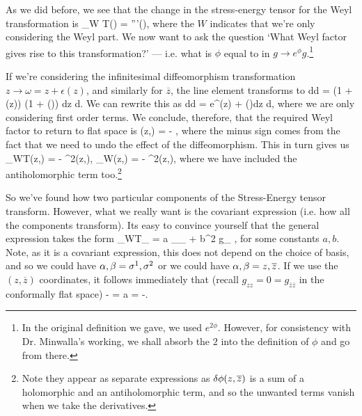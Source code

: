 As we did before, we see that the change in the stress-energy tensor for the Weyl transformation is
\bse 
    \del_W T(\omega) = \epsilon'''(\omega),
\ese
where the $W$ indicates that we're only considering the Weyl part. We now want to ask the question `What Weyl factor gives rise to this transformation?' --- i.e. what is $\phi$ equal to in $g \to e^{\phi}g$.\footnote{In the original definition we gave, we used $e^{2\phi}$. However, for consistency with Dr. Minwalla's working, we shall absorb the $2$ into the definition of $\phi$ and go from there.} 

If we're considering the infinitesimal diffeomorphism transformation $z \to \omega = z +\epsilon(z)$, and similarly for $\overline{z}$, the line element transforms to
\bse 
    d\omega d\overline{\omega} = \big(1 + \p\epsilon(z)\big) \big(1 + \overline{\p}\overline{\epsilon}()\big) dz d.
\ese 
We can rewrite this as 
\bse 
    d\omega d\overline{\omega} = e^{\p\epsilon(z) + \overline{\p}\overline{\epsilon}()}dz d,
\ese 
where we are only considering first order terms. We conclude, therefore, that the required Weyl factor to return to flat space is 
\bse 
    \del\phi(z,) = - ,
\ese 
where the minus sign comes from the fact that we need to undo the effect of the diffeomorphism. This in turn gives us 
\bse 
    \del_WT(z,) = - \p^2\del\phi(z,), \qquad {} \qquad \del_W(z,) = - \overline{\p}^2\del\phi(z,),
\ese
where we have included the antiholomorphic term too.\footnote{Note they appear as separate expressions as $\delta\phi(z,\overline{z})$ is a sum of a holomorphic and an antiholomorphic term, and so the unwanted terms vanish when we take the derivatives.}

So we've found how two particular components of the Stress-Energy tensor transform. However, what we really want is the covariant expression (i.e. how all the components transform). Its easy to convince yourself that the general expression takes the form 
\bse 
    \del_WT_{\a\beta} = a \p_{\a}\p_{\beta} \del\phi + b\nabla^2 g_{\a\beta} \del\phi,
\ese 
for some constants $a,b$. Note, as it is a covariant expression, this does not depend on the choice of basis, and so we could have $\alpha,\beta = \sigma^1,\sigma^2$ or we could have $\alpha,\beta=z,\overline{z}$. If we use the $(z,\overline{z})$ coordinates, it follows immediately that (recall $g_{zz} = 0 = g_{\overline{z}\overline{z}}$ in the conformally flat space)
\bse 
    - = a = -.
\ese 


